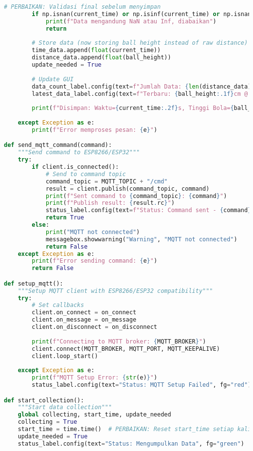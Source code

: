 \begin{itemize}
\begin{scriptsize}
\begin{lstlisting}[language=python]
        # PERBAIKAN: Validasi final sebelum menyimpan
        if np.isnan(current_time) or np.isinf(current_time) or np.isnan(ball_height) or np.isinf(ball_height):
            print(f"Data mengandung NaN atau Inf, diabaikan")
            return
        
        # Store data (now storing ball height instead of raw distance)
        time_data.append(float(current_time))
        distance_data.append(float(ball_height))
        update_needed = True
        
        # Update GUI
        data_count_label.config(text=f"Jumlah Data: {len(distance_data)}")
        latest_data_label.config(text=f"Terbaru: {ball_height:.1f}cm @ {current_time:.2f}s [{device}]")
        
        print(f"Disimpan: Waktu={current_time:.2f}s, Tinggi Bola={ball_height:.1f}cm (Mentah={d:.1f}cm), Perangkat={device}")
        
    except Exception as e:
        print(f"Error memproses pesan: {e}")

def send_mqtt_command(command):
    """Send command to ESP8266/ESP32"""
    try:
        if client.is_connected():
            # Send to command topic
            command_topic = MQTT_TOPIC + "/cmd"
            result = client.publish(command_topic, command)
            print(f"Sent command to {command_topic}: {command}")
            print(f"Publish result: {result.rc}")
            status_label.config(text=f"Status: Command sent - {command}", fg="blue")
            return True
        else:
            print("MQTT not connected")
            messagebox.showwarning("Warning", "MQTT not connected")
            return False
    except Exception as e:
        print(f"Error sending command: {e}")
        return False

def setup_mqtt():
    """Setup MQTT client with ESP8266/ESP32 compatibility"""
    try:
        # Set callbacks
        client.on_connect = on_connect
        client.on_message = on_message
        client.on_disconnect = on_disconnect
        
        print(f"Connecting to MQTT broker: {MQTT_BROKER}")
        client.connect(MQTT_BROKER, MQTT_PORT, MQTT_KEEPALIVE)
        client.loop_start()
        
    except Exception as e:
        print(f"MQTT Setup Error: {str(e)}")
        status_label.config(text="Status: MQTT Setup Failed", fg="red")

def start_collection():
    """Start data collection"""
    global collecting, start_time, update_needed
    collecting = True
    start_time = time.time()  # PERBAIKAN: Reset start_time setiap kali mulai
    update_needed = True
    status_label.config(text="Status: Mengumpulkan Data", fg="green")
    

\end{lstlisting}
\end{scriptsize}
\end{itemize}
